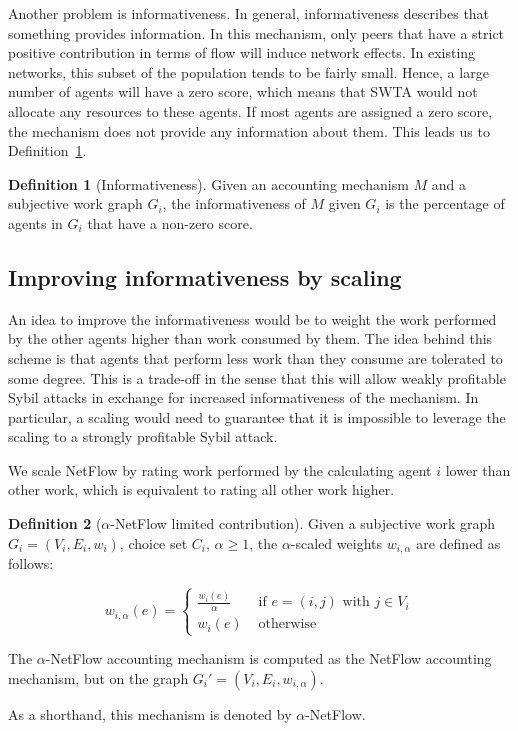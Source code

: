 \documentclass[a4paper,11pt]{book}
\theoremstyle{definition}
\newtheorem{definition}{Definition}
\begin{document}
Another problem is informativeness. In general, informativeness describes that something provides
information. In this mechanism,
only peers that have a strict positive contribution in terms of flow will induce network effects.
In existing networks, this subset of the population tends to be fairly small. Hence, a large
number of agents will have a zero score, which means that SWTA would not allocate any resources
to these agents. If most agents are assigned a zero score, the mechanism does not provide any information
about them. This leads us to Definition~\ref{def:informativeness}.

\begin{definition}[Informativeness]
    Given an accounting mechanism $M$ and a subjective work graph $G_i$, the informativeness of
    $M$ given $G_i$ is the percentage of agents in $G_i$ that have a non-zero score.
    \label{def:informativeness}
\end{definition}


\subsection{Improving informativeness by scaling}
An idea to improve the informativeness would be to weight the work performed by the other
agents higher than work consumed by them. The idea behind this scheme is that agents
that perform less work than they consume are tolerated to some degree. This is a trade-off
in the sense that this will allow weakly profitable Sybil attacks in exchange for increased
informativeness of the mechanism. In particular, a scaling would need to guarantee
that it is impossible to leverage the scaling to a strongly profitable Sybil attack. 

We scale NetFlow by rating work performed by the calculating agent $i$ lower than other
work, which is equivalent to rating all other work higher.

\begin{definition}[$\alpha$-NetFlow limited contribution]
    Given a subjective work graph $G_i = (V_i, E_i, w_i)$, choice set $C_i$, $\alpha \geq 1$, the $\alpha$-scaled
    weights $w_{i,\alpha}$ are defined as follows:

    \begin{equation*}
        w_{i,\alpha}(e) = 
        \begin{cases}
            \frac{w_i(e)}{\alpha} &\mbox{ if } e = (i, j) \mbox{ with } j \in V_i \\
            w_i(e) &\mbox{ otherwise}
        \end{cases}
    \end{equation*}
    
    The $\alpha$-NetFlow accounting mechanism is computed as the NetFlow accounting
    mechanism, but on the graph $G_i' = (V_i, E_i, w_{i,\alpha})$.

    As a shorthand, this mechanism is denoted by $\alpha$-NetFlow.
\end{definition}
\end{document}
